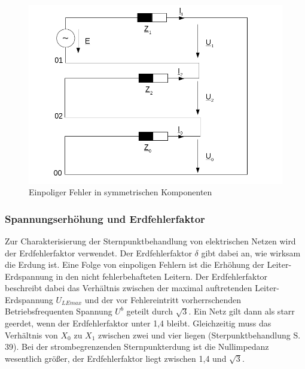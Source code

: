 \documentclass{scrartcl}
\begin{document}
\begin{onehalfspace}
	\begin{figure}[H]
	\centering
	\includegraphics[scale=0.6]{img/einpol-fehler.png}
	\caption{Einpoliger Fehler in symmetrischen Komponenten}
	\label{einpol-fehler}
	\end{figure}
	
\subsubsection{Spannungserhöhung und Erdfehlerfaktor}
Zur Charakterisierung der Sternpunktbehandlung von elektrischen Netzen wird der Erdfehlerfaktor verwendet. Der Erdfehlerfaktor $\delta$ gibt dabei an, wie wirksam die Erdung ist. Eine Folge von einpoligen Fehlern ist die Erhöhung der Leiter-Erdspannung in den nicht fehlerbehafteten Leitern. Der Erdfehlerfaktor beschreibt dabei das Verhältnis zwischen der maximal auftretenden Leiter-Erdspannung $U_{LEmax}$ und der vor Fehlereintritt vorherrschenden Betriebsfrequenten Spannung $U^b$ geteilt durch $\sqrt{3}$. Ein Netz gilt dann als \glqq starr geerdet\grqq, wenn der Erdfehlerfaktor unter 1,4 bleibt. Gleichzeitig muss das Verhältnis von $X_0$ zu $X_1$ zwischen zwei und vier liegen (Sterpunktbehandlung S. 39). Bei der strombegrenzenden Sternpunkterdung ist die Nullimpedanz wesentlich größer, der Erdfehlerfaktor liegt zwischen 1,4 und $\sqrt{3}$.


\end{onehalfspace}
\end{document}
